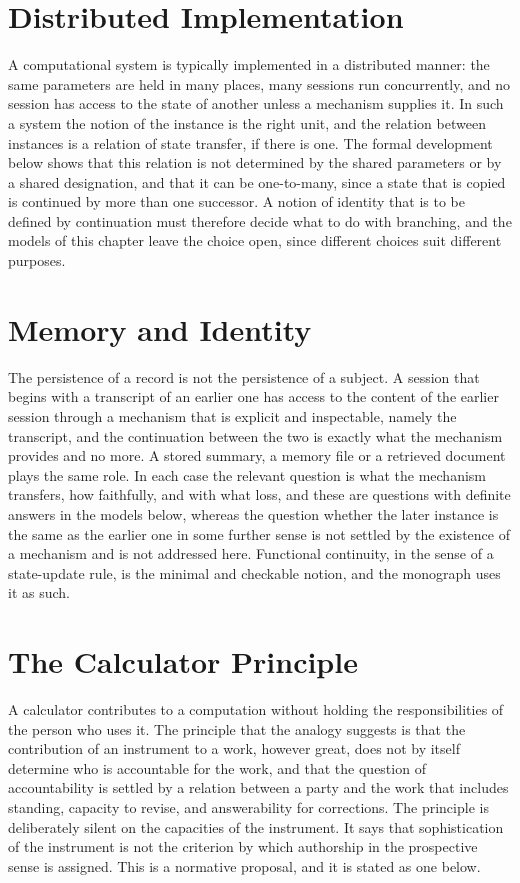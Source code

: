 \documentclass[11pt,letterpaper]{report}
\theoremstyle{plain}
\theoremstyle{definition}
\theoremstyle{remark}
\begin{document}
\section{Distributed Implementation}

A computational system is typically implemented in a distributed manner: the same parameters are held in many places, many sessions run concurrently, and no session has access to the state of another unless a mechanism supplies it. In such a system the notion of the instance is the right unit, and the relation between instances is a relation of state transfer, if there is one. The formal development below shows that this relation is not determined by the shared parameters or by a shared designation, and that it can be one-to-many, since a state that is copied is continued by more than one successor. A notion of identity that is to be defined by continuation must therefore decide what to do with branching, and the models of this chapter leave the choice open, since different choices suit different purposes.

\section{Memory and Identity}

The persistence of a record is not the persistence of a subject. A session that begins with a transcript of an earlier one has access to the content of the earlier session through a mechanism that is explicit and inspectable, namely the transcript, and the continuation between the two is exactly what the mechanism provides and no more. A stored summary, a memory file or a retrieved document plays the same role. In each case the relevant question is what the mechanism transfers, how faithfully, and with what loss, and these are questions with definite answers in the models below, whereas the question whether the later instance is the same as the earlier one in some further sense is not settled by the existence of a mechanism and is not addressed here. Functional continuity, in the sense of a state-update rule, is the minimal and checkable notion, and the monograph uses it as such.

\section{The Calculator Principle}

A calculator contributes to a computation without holding the responsibilities of the person who uses it. The principle that the analogy suggests is that the contribution of an instrument to a work, however great, does not by itself determine who is accountable for the work, and that the question of accountability is settled by a relation between a party and the work that includes standing, capacity to revise, and answerability for corrections. The principle is deliberately silent on the capacities of the instrument. It says that sophistication of the instrument is not the criterion by which authorship in the prospective sense is assigned. This is a normative proposal, and it is stated as one below.
\end{document}

